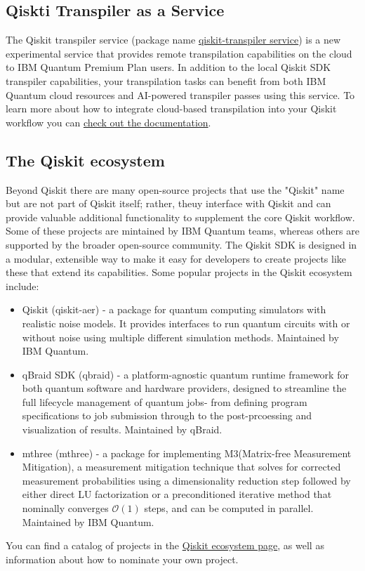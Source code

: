 \documentclass[12pt, oneside]{book}
\theoremstyle{definition}
\theoremstyle{definition}
\theoremstyle{remark}
\begin{document}
\subsection{Qiskti Transpiler as a Service}
The Qiskit transpiler service (package name \href{https://pypi.org/project/qiskit-transpiler-service/}{qiskit-transpiler service}) is a new experimental service that provides remote transpilation capabilities on the cloud to IBM Quantum Premium Plan users. In addition to the local Qiskit SDK transpiler capabilities, your transpilation tasks can benefit from both IBM Quantum cloud resources and AI-powered transpiler passes using this service. To learn more about how to integrate cloud-based transpilation into your Qiskit workflow you can \href{https://docs.quantum.ibm.com/guides/qiskit-transpiler-service}{check out the documentation}.

\subsection{The Qiskit ecosystem}
Beyond Qiskit there are many open-source projects that use the "Qiskit" name but are not part of Qiskit itself; rather, theuy interface with Qiskit and can provide valuable additional functionality to supplement the core Qiskit workflow. Some of these projects are mintained by IBM Quantum teams, whereas others are supported by the broader open-source community. The Qiskit SDK is designed in a modular, extensible way to make it easy for developers to create projects like these that extend its capabilities.
Some popular projects in the Qiskit ecosystem include:
\begin{itemize}
    \item Qiskit (qiskit-aer) - a package for quantum computing simulators with realistic noise models. It provides interfaces to run quantum circuits with or without noise using multiple different simulation methods. Maintained by IBM Quantum.
    \item qBraid SDK (qbraid) - a platform-agnostic quantum runtime framework for both quantum software and hardware providers, designed to streamline the full lifecycle management of quantum jobs- from defining program specifications to job submission through to the post-prcoessing and visualization of results. Maintained by qBraid.
    \item mthree (mthree) - a package for implementing M3(Matrix-free Measurement Mitigation), a measurement mitigation technique that solves for corrected measurement probabilities using a dimensionality reduction step followed by either direct LU factorization or a preconditioned iterative method that nominally converges $\mathcal{O}(1)$ steps, and can be computed in parallel. Maintained by IBM Quantum.
\end{itemize}
You can find a catalog of projects in the \href{https://qiskit.github.io/ecosystem/}{Qiskit ecosystem page}, as well as information about how to nominate your own project.
\end{document}
